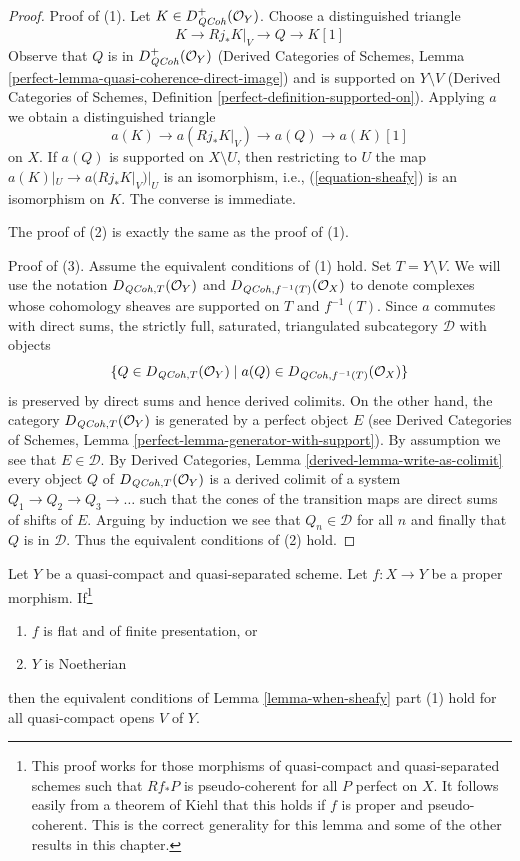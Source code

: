 \begin{proof}
Proof of (1). Let $K \in D_{\mathit{QCoh}}^+(\mathcal{O}_Y)$.
Choose a distinguished triangle
$$
K \to Rj_*K|_V \to Q \to K[1]
$$
Observe that $Q$ is in $D_{\mathit{QCoh}}^+(\mathcal{O}_Y)$
(Derived Categories of Schemes, Lemma
\ref{perfect-lemma-quasi-coherence-direct-image})
and is supported on $Y \setminus V$
(Derived Categories of Schemes, Definition
\ref{perfect-definition-supported-on}).
Applying $a$ we obtain a distinguished triangle
$$
a(K) \to a(Rj_*K|_V) \to a(Q) \to a(K)[1]
$$
on $X$. If $a(Q)$ is supported on $X \setminus U$, then
restricting to $U$ the map $a(K)|_U \to a(Rj_*K|_V)|_U$ is an
isomorphism, i.e., (\ref{equation-sheafy}) is an isomorphism on $K$.
The converse is immediate.

\medskip\noindent
The proof of (2) is exactly the same as the proof of (1).

\medskip\noindent
Proof of (3). Assume the equivalent conditions of (1) hold.
Set $T = Y \setminus V$.
We will use the notation $D_{\mathit{QCoh}, T}(\mathcal{O}_Y)$ and
$D_{\mathit{QCoh}, f^{-1}(T)}(\mathcal{O}_X)$ to denote complexes
whose cohomology sheaves are supported on $T$ and $f^{-1}(T)$.
Since $a$ commutes with direct sums, the strictly full, saturated, triangulated
subcategory $\mathcal{D}$ with objects
$$
\{Q \in D_{\mathit{QCoh}, T}(\mathcal{O}_Y) \mid
a(Q) \in D_{\mathit{QCoh}, f^{-1}(T)}(\mathcal{O}_X)\}
$$
is preserved by direct sums and hence derived colimits.
On the other hand, the category $D_{\mathit{QCoh}, T}(\mathcal{O}_Y)$
is generated by a perfect object $E$
(see Derived Categories of Schemes, Lemma
\ref{perfect-lemma-generator-with-support}).
By assumption we see that $E \in \mathcal{D}$.
By Derived Categories, Lemma \ref{derived-lemma-write-as-colimit}
every object $Q$ of $D_{\mathit{QCoh}, T}(\mathcal{O}_Y)$ is a derived
colimit of a system $Q_1 \to Q_2 \to Q_3 \to \ldots$
such that the cones of the transition maps are direct sums
of shifts of $E$. Arguing by induction we see that
$Q_n \in \mathcal{D}$ for all $n$ and finally that $Q$ is
in $\mathcal{D}$. Thus the equivalent conditions of (2) hold.
\end{proof}

\begin{lemma}
\label{lemma-proper-noetherian}
Let $Y$ be a quasi-compact and quasi-separated scheme.
Let $f : X \to Y$ be a proper morphism. If\footnote{This proof works for those
morphisms of quasi-compact and quasi-separated schemes such that
$Rf_*P$ is pseudo-coherent for all $P$ perfect on $X$. It follows
easily from a theorem of Kiehl \cite{Kiehl} that this holds if
$f$ is proper and pseudo-coherent. This is the correct generality
for this lemma and some of the other results in this chapter.}
\begin{enumerate}
\item $f$ is flat and of finite presentation, or
\item $Y$ is Noetherian
\end{enumerate}
then the equivalent conditions of Lemma \ref{lemma-when-sheafy} part (1)
hold for all quasi-compact opens $V$ of $Y$.
\end{lemma}

